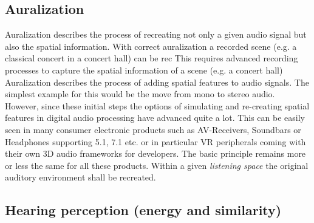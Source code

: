 \documentclass[a4paper,11pt]{article}%
\renewcommand{\\}{\vspace*{0.5\baselineskip} \newline}
\begin{document}


\subsection{Auralization}
\label{Sec:auralization}
Auralization describes the process of recreating not only a given audio signal but also the spatial information. With correct auralization a recorded scene (e.g. a classical concert in a concert hall) can be rec
\newline
This requires advanced recording processes to capture the spatial information of a scene (e.g. a concert hall)
\newline
Auralization describes the process of adding spatial features to audio signals. The simplest example for this would be the move from mono to stereo audio. However, since these initial steps the options of simulating and re-creating spatial features in digital audio processing have advanced quite a lot. This can be easily seen in many consumer electronic products such as AV-Receivers, Soundbars or Headphones supporting 5.1, 7.1  etc. or in particular \ac{VR} peripherals coming with their own 3D audio frameworks for developers.
\newline
\newline
The basic principle remains more or less the same for all these products. Within a given \textit{listening space} the original auditory environment shall be recreated.


\subsection{Hearing perception (energy and similarity)}



\end{document}
